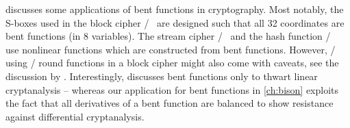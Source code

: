 \textcite[Chapter~4]{tokareva15} discusses some applications of bent functions in cryptography.
Most notably, the S-boxes used in the block cipher \cast/~ are designed such that all 32 coordinates are bent functions (in 8 variables).
The stream cipher \grain/~ and the hash function \haval/~ use nonlinear functions which are constructed from bent functions.
However, \eg/ using \AB/ round functions in a block cipher might also come with caveats, see the discussion by \textcite{EC:CanVid02}.
Interestingly, \citeauthor{tokareva15} discusses bent functions only to thwart linear cryptanalysis -- whereas our application for bent functions in \cref{ch:bison} exploits the fact that all derivatives of a bent function are balanced to show resistance against differential cryptanalysis.
